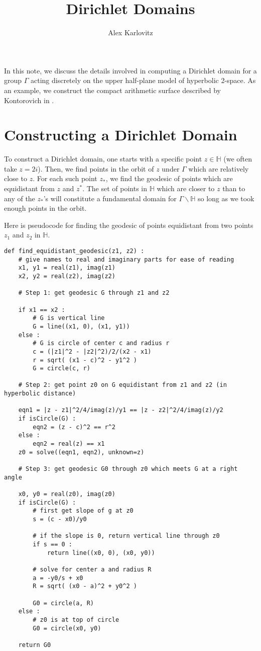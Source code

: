 \documentclass[]{article}
\title{Dirichlet Domains}
\author{Alex Karlovitz}
\date{}
\begin{document}
	
	\maketitle
	
In this note, we discuss the details involved in computing a Dirichlet domain for a group $\Gamma$ acting discretely on the upper half-plane model of hyperbolic 2-space.
As an example, we construct the compact arithmetic surface described by Kontorovich in \cite{kontorovich2011}.
	
\section*{Constructing a Dirichlet Domain}
	
To construct a Dirichlet domain, one starts with a specific point $z \in \mathbb{H}$ (we often take $z = 2i$).
Then, we find points in the orbit of $z$ under $\Gamma$ which are relatively close to $z$.
For each such point $z_*$, we find the geodesic of points which are equidistant from $z$ and $z^*$.
The set of points in $\mathbb{H}$ which are closer to $z$ than to any of the $z_*$'s will constitute a fundamental domain for $\Gamma\backslash\mathbb{H}$ so long as we took enough points in the orbit.

Here is pseudocode for finding the geodesic of points equidistant from two points $z_1$ and $z_2$ in $\mathbb{H}$.
\begin{verbatim}
def find_equidistant_geodesic(z1, z2) :
    # give names to real and imaginary parts for ease of reading
    x1, y1 = real(z1), imag(z1)
    x2, y2 = real(z2), imag(z2)

    # Step 1: get geodesic G through z1 and z2
    
    if x1 == x2 :
        # G is vertical line
        G = line((x1, 0), (x1, y1))
    else :
        # G is circle of center c and radius r
        c = (|z1|^2 - |z2|^2)/2/(x2 - x1)
        r = sqrt( (x1 - c)^2 - y1^2 )
        G = circle(c, r)
        
    # Step 2: get point z0 on G equidistant from z1 and z2 (in hyperbolic distance)
    
    eqn1 = |z - z1|^2/4/imag(z)/y1 == |z - z2|^2/4/imag(z)/y2
    if isCircle(G) :
        eqn2 = (z - c)^2 == r^2
    else :
        eqn2 = real(z) == x1
    z0 = solve((eqn1, eqn2), unknown=z)
    
    # Step 3: get geodesic G0 through z0 which meets G at a right angle
    
    x0, y0 = real(z0), imag(z0)
    if isCircle(G) :
        # first get slope of g at z0
        s = (c - x0)/y0
        
        # if the slope is 0, return vertical line through z0
        if s == 0 :
            return line((x0, 0), (x0, y0))
        
        # solve for center a and radius R
        a = -y0/s + x0
        R = sqrt( (x0 - a)^2 + y0^2 )
        
        G0 = circle(a, R)
    else :
        # z0 is at top of circle
        G0 = circle(x0, y0)
        
    return G0
\end{verbatim}
	
	\pagebreak
	
	\printbibliography
	
\end{document}
